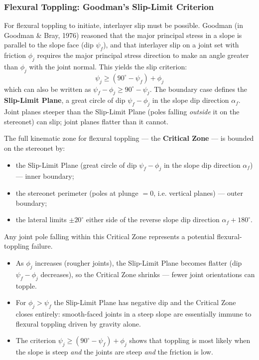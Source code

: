 \documentclass[a4paper,12pt]{article}
\begin{document}
\subsubsection{Flexural Toppling: Goodman's Slip-Limit Criterion}
For flexural toppling to initiate, interlayer slip must be possible. Goodman (in Goodman \& Bray, 1976) reasoned that the major principal stress in a slope is parallel to the slope face (dip $\psi_f$), and that interlayer slip on a joint set with friction $\phi_j$ requires the major principal stress direction to make an angle greater than $\phi_j$ with the joint normal. This yields the slip criterion:
\[
\boxed{\psi_j \geq (90^\circ - \psi_f) + \phi_j}
\]
which can also be written as $\psi_f - \phi_j \geq 90^\circ - \psi_j$. The boundary case defines the \textbf{Slip-Limit Plane}, a great circle of dip $\psi_f - \phi_j$ in the slope dip direction $\alpha_f$. Joint planes steeper than the Slip-Limit Plane (poles falling \emph{outside} it on the stereonet) can slip; joint planes flatter than it cannot.

The full kinematic zone for flexural toppling --- the \textbf{Critical Zone} --- is bounded on the stereonet by:
\begin{itemize}[nosep]
    \item the Slip-Limit Plane (great circle of dip $\psi_f - \phi_j$ in the slope dip direction $\alpha_f$) --- inner boundary;
    \item the stereonet perimeter (poles at plunge $= 0$, i.e. vertical planes) --- outer boundary;
    \item the lateral limits $\pm 20^\circ$ either side of the reverse slope dip direction $\alpha_f + 180^\circ$.
\end{itemize}
Any joint pole falling within this Critical Zone represents a potential flexural-toppling failure.

\begin{notebox}
\begin{itemize}[nosep]
    \item As $\phi_j$ increases (rougher joints), the Slip-Limit Plane becomes flatter (dip $\psi_f - \phi_j$ decreases), so the Critical Zone shrinks --- fewer joint orientations can topple.
    \item For $\phi_j > \psi_f$ the Slip-Limit Plane has negative dip and the Critical Zone closes entirely: smooth-faced joints in a steep slope are essentially immune to flexural toppling driven by gravity alone.
    \item The criterion $\psi_j \geq (90^\circ - \psi_f) + \phi_j$ shows that toppling is most likely when the slope is steep \emph{and} the joints are steep \emph{and} the friction is low.
\end{itemize}
\end{notebox}
\end{document}
